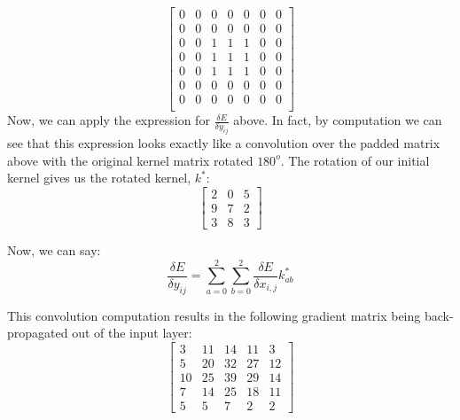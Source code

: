 \documentclass[a4paper]{article}
\begin{document}
\begin{enumerate}
{$$ \begin{bmatrix} 
0 & 0 & 0 & 0 & 0 & 0 & 0 \\
0 & 0 & 0 & 0 & 0 & 0 & 0 \\
0 & 0 & 1 & 1 & 1 & 0 & 0 \\
0 & 0 & 1 & 1 & 1 & 0 & 0 \\
0 & 0 & 1 & 1 & 1 & 0 & 0 \\
0 & 0 & 0 & 0 & 0 & 0 & 0 \\
0 & 0 & 0 & 0 & 0 & 0 & 0 \\
\end{bmatrix} $$
\newline
\newline
Now, we can apply the expression for $ \frac{\delta E}{\delta y_{ij}} $ above. In fact, by computation we can see that this expression looks exactly like a convolution over the padded matrix above with the original kernel matrix rotated $180^{o}$. The rotation of our initial kernel gives us the rotated kernel, $k^{*}$:
$$
\begin{bmatrix}
2 & 0 & 5 \\
9 & 7 & 2 \\
3 & 8 & 3 
\end{bmatrix}
$$

Now, we can say:
$$ \frac{\delta E}{\delta y_{ij}} = \sum_{a=0}^2 \sum_{b=0}^2 \frac{\delta E}{\delta x_{i,j}} k^*_{ab}$$

This convolution computation results in the following gradient matrix being back-propagated out of the input layer:
$$
\begin{bmatrix}
3 & 11 & 14 & 11 & 3 \\
5 & 20 & 32 & 27 & 12 \\
10 & 25 & 39 & 29 & 14 \\
7 & 14 & 25 & 18 & 11 \\
5 & 5 & 7 & 2 & 2 
\end{bmatrix}
$$
}
\end{enumerate}
\end{document}
